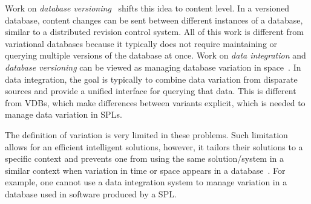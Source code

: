 %
Work on \emph{database versioning}~\cite{datasetVersioning,dbVersioning}
shifts this idea to content level. In a versioned database, 
content changes can be sent between different instances of a database,
similar to a distributed revision control system.
%
All of this work is different from variational databases because it typically
does not require maintaining or querying multiple versions of the database at
once.
%
Work on \emph{data integration} and \emph{database versioning} can be viewed as
managing database variation in space~\cite{dataIntegBook}. In data integration,
the goal is typically to combine data variation from disparate sources and
provide a unified interface for querying that data. This is different from
VDBs, which make differences between variants explicit, which is needed to
manage data variation in SPLs.

 The definition of variation is very limited in these problems. Such
 limitation allows for an efficient intelligent solutions, however, it tailors
 their solutions to a specific context and prevents one from using the same
 solution/system in a similar context when variation in time or space appears
 in a database~\cite{schVersioningSurvey95Roddick}. For example, one cannot
 use a data integration system to manage variation in a database used in
 software produced by a SPL.




